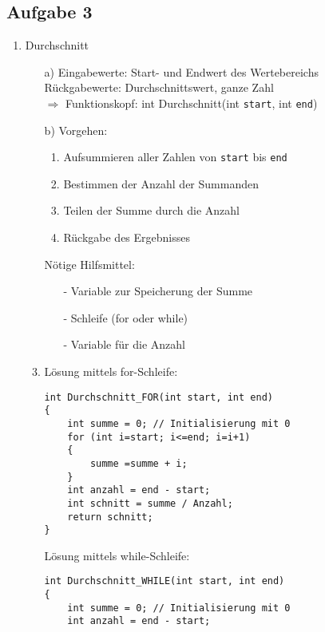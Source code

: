 \subsection{Aufgabe 3}
\begin{enumerate}
\item Durchschnitt
\begin{enumerate}
\item[a)] Eingabewerte: Start- und Endwert des Wertebereichs \\
	      Rückgabewerte: Durchschnittswert, ganze Zahl \\
	      $\Rightarrow$ Funktionskopf: int Durchschnitt(int \texttt{start}, int \texttt{end})
\item[b)] Vorgehen:
\begin{enumerate}
\item Aufsummieren aller Zahlen von \texttt{start} bis \texttt{end}
\item Bestimmen der Anzahl der Summanden
\item Teilen der Summe durch die Anzahl
\item Rückgabe des Ergebnisses
\end{enumerate}
Nötige Hilfsmittel:
\begin{itemize}
\item[-] Variable zur Speicherung der Summe
\item[-] Schleife (for oder while)
\item[-] Variable für die Anzahl
\end{itemize}
\item Lösung mittels for-Schleife:
\begin{lstlisting}
int Durchschnitt_FOR(int start, int end)
{
	int summe = 0; // Initialisierung mit 0
	for (int i=start; i<=end; i=i+1)
	{
		summe =summe + i;
	}
	int anzahl = end - start;
	int schnitt = summe / Anzahl;
	return schnitt;
}
\end{lstlisting}
Lösung mittels while-Schleife:
\begin{lstlisting}
int Durchschnitt_WHILE(int start, int end)
{
	int summe = 0; // Initialisierung mit 0
	int anzahl = end - start;


\end{lstlisting}
\end{enumerate}
\end{enumerate}
